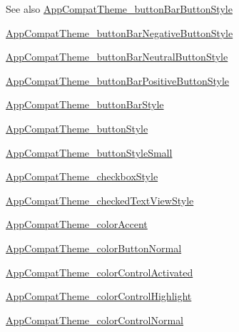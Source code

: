 \begin{DoxySeeAlso}{See also}
\hyperlink{classandroid_1_1support_1_1v7_1_1appcompat_1_1R_1_1styleable_a5a418303f6c9ee7dca64fc5e087c5d5d}{App\+Compat\+Theme\+\_\+button\+Bar\+Button\+Style} 

\hyperlink{classandroid_1_1support_1_1v7_1_1appcompat_1_1R_1_1styleable_a99db68caf8feef60226a106581b9314e}{App\+Compat\+Theme\+\_\+button\+Bar\+Negative\+Button\+Style} 

\hyperlink{classandroid_1_1support_1_1v7_1_1appcompat_1_1R_1_1styleable_aec02227eb23e237d76e41c93095e1acc}{App\+Compat\+Theme\+\_\+button\+Bar\+Neutral\+Button\+Style} 

\hyperlink{classandroid_1_1support_1_1v7_1_1appcompat_1_1R_1_1styleable_a5a97b06013106a661c91f3f55df6b4d0}{App\+Compat\+Theme\+\_\+button\+Bar\+Positive\+Button\+Style} 

\hyperlink{classandroid_1_1support_1_1v7_1_1appcompat_1_1R_1_1styleable_a5f507e4262ada8a443068f2d7537585f}{App\+Compat\+Theme\+\_\+button\+Bar\+Style} 

\hyperlink{classandroid_1_1support_1_1v7_1_1appcompat_1_1R_1_1styleable_a04456db225a82b7745bd0f1915afe311}{App\+Compat\+Theme\+\_\+button\+Style} 

\hyperlink{classandroid_1_1support_1_1v7_1_1appcompat_1_1R_1_1styleable_a1cb9b470321310da072244cad16cbda3}{App\+Compat\+Theme\+\_\+button\+Style\+Small} 

\hyperlink{classandroid_1_1support_1_1v7_1_1appcompat_1_1R_1_1styleable_af7ac616091affeb34fec71e5ee8b5c65}{App\+Compat\+Theme\+\_\+checkbox\+Style} 

\hyperlink{classandroid_1_1support_1_1v7_1_1appcompat_1_1R_1_1styleable_aa6468311a9d0b5f772dae98fbcf245cd}{App\+Compat\+Theme\+\_\+checked\+Text\+View\+Style} 

\hyperlink{classandroid_1_1support_1_1v7_1_1appcompat_1_1R_1_1styleable_aff4d2589b88c34cd389125973debcd18}{App\+Compat\+Theme\+\_\+color\+Accent} 

\hyperlink{classandroid_1_1support_1_1v7_1_1appcompat_1_1R_1_1styleable_a8b1a254d15e9a8ad527d4515f5395b3c}{App\+Compat\+Theme\+\_\+color\+Button\+Normal} 

\hyperlink{classandroid_1_1support_1_1v7_1_1appcompat_1_1R_1_1styleable_a9111aa1922570418c642eb40adbae88e}{App\+Compat\+Theme\+\_\+color\+Control\+Activated} 

\hyperlink{classandroid_1_1support_1_1v7_1_1appcompat_1_1R_1_1styleable_a504c897bce159e8458dad5fa7717be03}{App\+Compat\+Theme\+\_\+color\+Control\+Highlight} 

\hyperlink{classandroid_1_1support_1_1v7_1_1appcompat_1_1R_1_1styleable_a3a60170ac3e2b1e037970b2ba1eea507}{App\+Compat\+Theme\+\_\+color\+Control\+Normal} 


\end{DoxySeeAlso}
